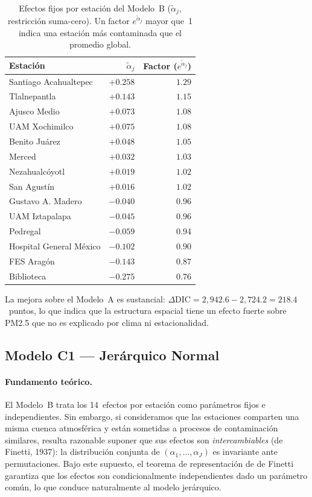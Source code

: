 ﻿\documentclass[12pt]{article}
\begin{document}
\begin{table}[H]
\centering
\caption{Efectos fijos por estaci\'on del Modelo~B ($\tilde\alpha_j$,
         restricci\'on suma-cero).
         Un factor $e^{\tilde\alpha_j}$ mayor que~1 indica una estaci\'on
         m\'as contaminada que el promedio global.}
\label{tab:alphaj_B}
\begin{tabular}{>{\raggedright\arraybackslash}p{5.5cm}rr}
\toprule
Estaci\'on & $\tilde\alpha_j$ & Factor ($e^{\tilde\alpha_j}$) \\
\midrule
Santiago Acahualtepec   & $+0.258$ & $1.29$ \\
Tlalnepantla            & $+0.143$ & $1.15$ \\
Ajusco Medio            & $+0.073$ & $1.08$ \\
UAM Xochimilco          & $+0.075$ & $1.08$ \\
Benito Ju\'arez         & $+0.048$ & $1.05$ \\
Merced                  & $+0.032$ & $1.03$ \\
Nezahualc\'oyotl        & $+0.019$ & $1.02$ \\
San Agust\'in           & $+0.016$ & $1.02$ \\
Gustavo A. Madero       & $-0.040$ & $0.96$ \\
UAM Iztapalapa          & $-0.045$ & $0.96$ \\
Pedregal                & $-0.059$ & $0.94$ \\
Hospital General M\'exico& $-0.102$ & $0.90$ \\
FES Arag\'on            & $-0.143$ & $0.87$ \\
Biblioteca              & $-0.275$ & $0.76$ \\
\bottomrule
\end{tabular}
\end{table}

La mejora sobre el Modelo~A es sustancial:
$\Delta\text{DIC} = 2{,}942.6 - 2{,}724.2 = 218.4$~puntos,
lo que indica que la estructura espacial tiene un efecto fuerte
sobre PM2.5 que no es explicado por clima ni estacionalidad.


\subsection{Modelo C1 --- Jer\'arquico Normal}

\paragraph{Fundamento te\'orico.}
El Modelo~B trata los 14~efectos por estaci\'on como par\'ametros fijos
e independientes.
Sin embargo, si consideramos que las estaciones comparten una misma
cuenca atmosf\'erica y est\'an sometidas a procesos de contaminaci\'on
similares, resulta razonable suponer que sus efectos son
\emph{intercambiables} (de Finetti, 1937): la distribuci\'on conjunta
de $(\alpha_1,\ldots,\alpha_J)$ es invariante ante permutaciones.
Bajo este supuesto, el teorema de representaci\'on de de Finetti garantiza
que los efectos son condicionalmente independientes dado un par\'ametro
com\'un, lo que conduce naturalmente al modelo jer\'arquico.
\end{document}
